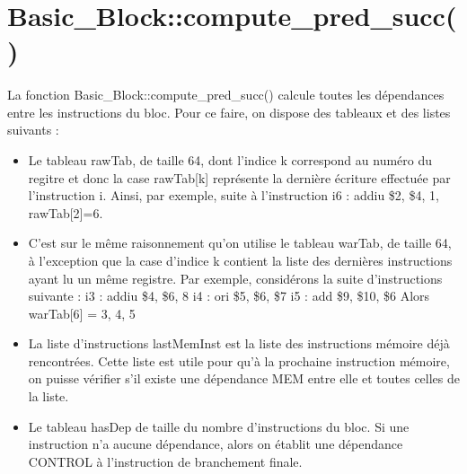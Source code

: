 \documentclass[a4paper,12pt]{report}
\begin{document}
\section{Basic\_Block::compute\_pred\_succ()}
\paragraph*{}

La fonction Basic\_Block::compute\_pred\_succ() calcule toutes les dépendances entre les instructions du bloc. Pour ce faire, on dispose des tableaux et des listes suivants :
\begin{itemize}
    \item Le tableau rawTab, de taille 64, dont l'indice k correspond au numéro du regitre et donc la case rawTab[k] représente la dernière écriture effectuée par l'instruction i. Ainsi, par exemple, suite à  l'instruction i6 : addiu \$2, \$4, 1, rawTab[2]=6.
    \item C'est sur le même raisonnement qu'on utilise le tableau warTab, de taille 64, à l'exception que la case d'indice k contient la liste des dernières instructions ayant lu un même registre. Par exemple, considérons la suite d'instructions suivante :
\newline    i3 : addiu \$4, \$6, 8
\newline    i4 : ori \$5, \$6, \$7
\newline    i5 : add \$9, \$10, \$6
\newline    Alors warTab[6] = { 3, 4, 5}

\item La liste d'instructions lastMemInst est la liste des instructions mémoire déjà rencontrées. Cette liste est utile pour qu'à la prochaine instruction mémoire, on puisse vérifier s'il existe une dépendance MEM entre elle et toutes celles de la liste.
\item Le tableau hasDep de taille du nombre d'instructions du bloc. Si une instruction n'a aucune dépendance, alors on établit une dépendance CONTROL à l'instruction de branchement finale.

\end{itemize}
\end{document}
